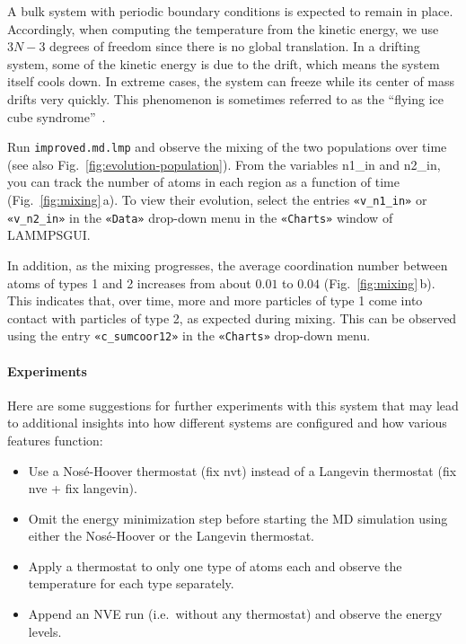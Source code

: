 \documentclass[9pt,tutorial]{livecoms}
\newcommand{\lmpcmd}[1]{\hspace{0pt}\colorbox{listing}{\textcolor{command}{\small{#1}}}\hspace{0pt}} %
\newcommand{\flecmd}[1]{\textcolor{command}{\texttt{#1}}} %
\newcommand{\guicmd}[1]{\textcolor{command}{\texttt{«#1»}}} %
\newcommand{\lammpsgui}{\textsf{LAMMPS\textendash GUI}}
\begin{document}
\begin{note}
  A bulk system with periodic boundary conditions is expected to remain
  in place.  Accordingly, when computing the temperature from the
  kinetic energy, we use $3N-3$ degrees of freedom since there is no
  global translation.  In a drifting system, some of the kinetic energy
  is due to the drift, which means the system itself cools down.  In
  extreme cases, the system can freeze while its center of mass drifts
  very quickly.  This phenomenon is sometimes referred to as the
  ``flying ice cube syndrome''~\cite{wong2016good}.
\end{note}

Run \flecmd{improved.md.lmp} and observe the mixing of the two populations
over time (see also Fig.~\ref{fig:evolution-population}).  From the
variables \lmpcmd{n1\_in} and \lmpcmd{n2\_in}, you can track the number
of atoms in each region as a function of time
(Fig.~\ref{fig:mixing}\,a).  To view their evolution, select the entries
\guicmd{v\_n1\_in} or \guicmd{v\_n2\_in} in the \guicmd{Data} drop-down
menu in the \guicmd{Charts} window of \lammpsgui{}.

In addition, as the mixing progresses, the average coordination number
between atoms of types 1 and 2 increases from about $0.01$ to $0.04$
(Fig.~\ref{fig:mixing}\,b).  This indicates that, over time, more and
more particles of type 1 come into contact with particles of type 2, as
expected during mixing.  This can be observed using the entry
\guicmd{c\_sumcoor12} in the \guicmd{Charts} drop-down menu.

\paragraph{Experiments}

Here are some suggestions for further experiments with this system that
may lead to additional insights into how different systems are configured
and how various features function:
\begin{itemize}
\item Use a Nos\'e-Hoover thermostat (\lmpcmd{fix nvt}) instead of a Langevin thermostat
  (\lmpcmd{fix nve} + \lmpcmd{fix langevin}).
\item Omit the energy minimization step before starting the MD simulation using either
the Nos\'e-Hoover or the Langevin thermostat.
\item Apply a thermostat to only one type of atoms each and observe the
  temperature for each type separately.
\item Append an NVE run (i.e.~without any thermostat) and observe the energy levels.
\end{itemize}
\end{document}
